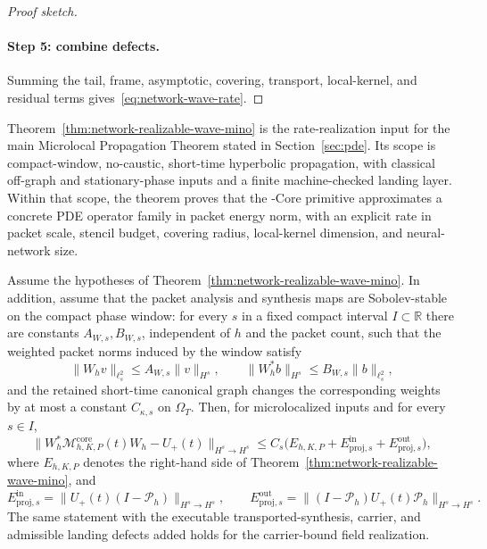 \begin{proof}[Proof sketch]
\paragraph{Step 5: combine defects.}
Summing the tail, frame, asymptotic, covering, transport, local-kernel, and residual terms gives~\eqref{eq:network-wave-rate}.
\end{proof}

Theorem~\ref{thm:network-realizable-wave-mino} is the rate-realization input for the main Microlocal Propagation Theorem stated in Section~\ref{sec:pde}.  Its scope is compact-window, no-caustic, short-time hyperbolic propagation, with classical off-graph and stationary-phase inputs and a finite machine-checked landing layer.  Within that scope, the theorem proves that the \MiNO-Core primitive approximates a concrete PDE operator family in packet energy norm, with an explicit rate in packet scale, stencil budget, covering radius, local-kernel dimension, and neural-network size.

\begin{corollary}
\label{cor:sobolev-field-mpt}
Assume the hypotheses of Theorem~\ref{thm:network-realizable-wave-mino}.  In addition, assume that the packet analysis and synthesis maps are Sobolev-stable on the compact phase window: for every $s$ in a fixed compact interval $I\subset\mathbb R$ there are constants $A_{W,s},B_{W,s}$, independent of $h$ and the packet count, such that the weighted packet norms induced by the window satisfy
\[
\|W_h v\|_{\ell^2_s}\le A_{W,s}\|v\|_{H^s},
\qquad
\|W_h^\ast b\|_{H^s}\le B_{W,s}\|b\|_{\ell^2_s},
\]
and the retained short-time canonical graph changes the corresponding weights by at most a constant $C_{\kappa,s}$ on $\Omega_T$.  Then, for microlocalized inputs and for every $s\in I$,
\[
\|W_h^\ast\mathcal M_{h,K,P}^{\mathrm{core}}(t)W_h-U_+(t)\|_{H^s\to H^s}
\le
C_s\bigl(
E_{h,K,P}
+E^{\mathrm{in}}_{\mathrm{proj},s}
+E^{\mathrm{out}}_{\mathrm{proj},s}
\bigr),
\]
where $E_{h,K,P}$ denotes the right-hand side of Theorem~\ref{thm:network-realizable-wave-mino}, and
\[
E^{\mathrm{in}}_{\mathrm{proj},s}
=
\|U_+(t)(I-\mathcal P_h)\|_{H^s\to H^s},
\qquad
E^{\mathrm{out}}_{\mathrm{proj},s}
=
\|(I-\mathcal P_h)U_+(t)\mathcal P_h\|_{H^s\to H^s}.
\]
The same statement with the executable transported-synthesis, carrier, and admissible landing defects added holds for the carrier-bound field realization.
\end{corollary}

